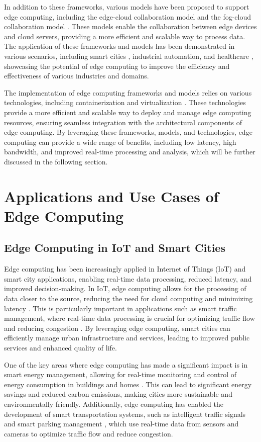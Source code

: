 \documentclass[11pt]{article}
\begin{document}
In addition to these frameworks, various models have been proposed to support edge computing, including the edge-cloud collaboration model \cite{ref25} and the fog-cloud collaboration model \cite{ref26}. These models enable the collaboration between edge devices and cloud servers, providing a more efficient and scalable way to process data. The application of these frameworks and models has been demonstrated in various scenarios, including smart cities \cite{ref3}, industrial automation, and healthcare \cite{ref27}, showcasing the potential of edge computing to improve the efficiency and effectiveness of various industries and domains.

The implementation of edge computing frameworks and models relies on various technologies, including containerization \cite{ref28} and virtualization \cite{ref29}. These technologies provide a more efficient and scalable way to deploy and manage edge computing resources, ensuring seamless integration with the architectural components of edge computing. By leveraging these frameworks, models, and technologies, edge computing can provide a wide range of benefits, including low latency, high bandwidth, and improved real-time processing and analysis, which will be further discussed in the following section.

\section{Applications and Use Cases of Edge Computing}

\subsection{Edge Computing in IoT and Smart Cities}

Edge computing has been increasingly applied in Internet of Things (IoT) and smart city applications, enabling real-time data processing, reduced latency, and improved decision-making. In IoT, edge computing allows for the processing of data closer to the source, reducing the need for cloud computing and minimizing latency \cite{ref20}. This is particularly important in applications such as smart traffic management, where real-time data processing is crucial for optimizing traffic flow and reducing congestion \cite{ref30}. By leveraging edge computing, smart cities can efficiently manage urban infrastructure and services, leading to improved public services and enhanced quality of life.

One of the key areas where edge computing has made a significant impact is in smart energy management, allowing for real-time monitoring and control of energy consumption in buildings and homes \cite{ref31}. This can lead to significant energy savings and reduced carbon emissions, making cities more sustainable and environmentally friendly. Additionally, edge computing has enabled the development of smart transportation systems, such as intelligent traffic signals and smart parking management \cite{ref32}, which use real-time data from sensors and cameras to optimize traffic flow and reduce congestion.
\end{document}
